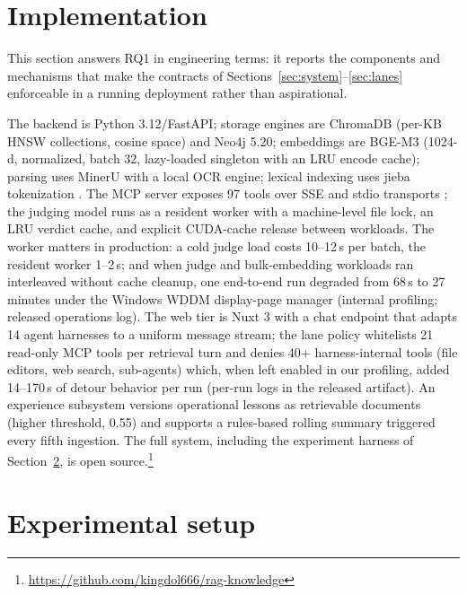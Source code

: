 \documentclass[preprint,12pt]{elsarticle}
\begin{document}
\section{Implementation}
\label{sec:impl}

This section answers RQ1 in engineering terms: it reports the components and
mechanisms that make the contracts of
Sections~\ref{sec:system}--\ref{sec:lanes} enforceable in a running
deployment rather than aspirational.

The backend is Python 3.12/FastAPI; storage engines are ChromaDB (per-KB
HNSW \cite{hnsw} collections, cosine space) and Neo4j 5.20; embeddings are BGE-M3
\cite{bge-m3} (1024-d, normalized, batch 32, lazy-loaded singleton with an
LRU encode cache); parsing uses MinerU \cite{mineru} with a local OCR
engine; lexical indexing uses jieba tokenization \cite{jieba}. The MCP
server exposes 97 tools over SSE and stdio transports \cite{mcp}; the
judging model runs as a resident worker with a machine-level file lock, an
LRU verdict cache, and explicit CUDA-cache release between workloads. The
worker matters in production: a cold judge load costs 10--12\,s per batch,
the resident worker 1--2\,s; and when judge and bulk-embedding workloads
ran interleaved without cache cleanup, one end-to-end run degraded from 68\,s
to 27 minutes under the Windows WDDM display-page manager (internal
profiling; released operations log). The
web tier is Nuxt 3 with a chat endpoint that adapts 14 agent harnesses to a
uniform message stream; the lane policy whitelists 21 read-only MCP tools
per retrieval turn and denies 40+ harness-internal tools (file editors,
web search, sub-agents) which, when left enabled in our profiling, added
14--170\,s of detour behavior per run (per-run logs in the released
artifact). An experience subsystem versions operational
lessons as retrievable documents (higher threshold, 0.55) and supports a
rules-based rolling summary triggered every fifth ingestion. The full
system, including the experiment harness of Section~\ref{sec:setup}, is
open source.\footnote{\url{https://github.com/kingdol666/rag-knowledge}}

\section{Experimental setup}
\label{sec:setup}
\end{document}
